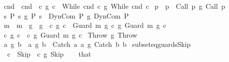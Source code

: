 \begin{isabellebody}
{\isacharbar}\ {\isachardoublequoteopen}cnd{}\ {\isacharequal}\ cnd{}\ {\isasymLongrightarrow}\ c{}\ {\isasymsubseteq}\isactrlsub g\ c{}\ {\isasymLongrightarrow}\ While\ cnd{}\ c{}\ {\isasymsubseteq}\isactrlsub g\ While\ cnd{}\ c{}{\isachardoublequoteclose}\isanewline
{\isacharbar}\ {\isachardoublequoteopen}p{}\ {\isacharequal}\ p{}\ {\isasymLongrightarrow}\ Call\ p{}\ {\isasymsubseteq}\isactrlsub g\ Call\ p{}{\isachardoublequoteclose}\isanewline
{\isacharbar}\ {\isachardoublequoteopen}{\isacharparenleft}{\isasymAnd}s{\isachardot}\ P{}\ s\ {\isasymsubseteq}\isactrlsub g\ P{}\ s{\isacharparenright}\ {\isasymLongrightarrow}\ DynCom\ P{}\ {\isasymsubseteq}\isactrlsub g\ DynCom\ P{}{\isachardoublequoteclose}\isanewline
{\isacharbar}\ {\isachardoublequoteopen}m{}\ {\isacharequal}\ m{}\ {\isasymLongrightarrow}\ g{}\ {\isacharequal}\ g{}\ {\isasymLongrightarrow}\ c{}\ {\isasymsubseteq}\isactrlsub g\ c{}\ {\isasymLongrightarrow}\ Guard\ m{}\ g{}\ c{}\ {\isasymsubseteq}\isactrlsub g\ Guard\ m{}\ g{}\ c{}{\isachardoublequoteclose}\isanewline
{\isacharbar}\ {\isachardoublequoteopen}c{}\ {\isasymsubseteq}\isactrlsub g\ c{}\ {\isasymLongrightarrow}\ c{}\ {\isasymsubseteq}\isactrlsub g\ Guard\ m{}\ g{}\ c{}{\isachardoublequoteclose}\isanewline
{\isacharbar}\ {\isachardoublequoteopen}Throw\ {\isasymsubseteq}\isactrlsub g\ Throw{\isachardoublequoteclose}\isanewline
{\isacharbar}\ {\isachardoublequoteopen}a{}\ {\isasymsubseteq}\isactrlsub g\ b{}\ {\isasymLongrightarrow}\ a{}\ {\isasymsubseteq}\isactrlsub g\ b{}\ {\isasymLongrightarrow}\ Catch\ a{}\ a{}\ {\isasymsubseteq}\isactrlsub g\ Catch\ b{}\ b{}{\isachardoublequoteclose}\isanewline
\isanewline
{}\isamarkupfalse%
\ subseteq{\isacharunderscore}guards{\isacharunderscore}Skip{\isacharcolon}\isanewline
\ \ {\isachardoublequoteopen}c\ {\isacharequal}\ Skip{\isachardoublequoteclose}\ \ {\isachardoublequoteopen}c\ {\isasymsubseteq}\isactrlsub g\ Skip{\isachardoublequoteclose}\isanewline
%
\isadelimproof
\ \ %
\endisadelimproof
%
\isatagproof
{}\isamarkupfalse%
\ that\ \isamarkupfalse%

\end{isabellebody}
